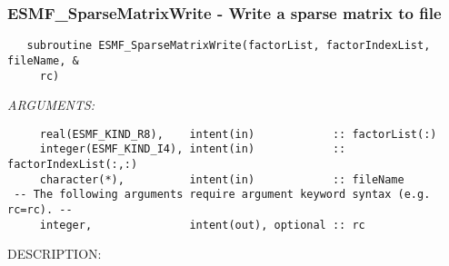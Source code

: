  
\setlength{\oldparskip}{\parskip}
\setlength{\parskip}{1.5ex}
\setlength{\oldparindent}{\parindent}
\setlength{\parindent}{0pt}
\setlength{\oldbaselineskip}{\baselineskip}
\setlength{\baselineskip}{11pt}
 
\def\bv{\begin{verbatim}}
\def\ev{\end{verbatim}}
\def\be{\begin{equation}}
\def\ee{\end{equation}}
\def\bea{\begin{eqnarray}}
\def\eea{\end{eqnarray}}
\def\bi{\begin{itemize}}
\def\ei{\end{itemize}}
\def\bn{\begin{enumerate}}
\def\en{\end{enumerate}}
\def\bd{\begin{description}}
\def\ed{\end{description}}
\def\({\left (}
\def\){\right )}
\def\[{\left [}
\def\]{\right ]}
\def\<{\left  \langle}
\def\>{\right \rangle}
\def\cI{{\cal I}}
\def\diag{\mathop{\rm diag}}
\def\tr{\mathop{\rm tr}}


 
\subsubsection [ESMF\_SparseMatrixWrite] {ESMF\_SparseMatrixWrite - Write a sparse matrix to file}


   \label{api:SparseMatrixWrite}
  
\begin{verbatim}   subroutine ESMF_SparseMatrixWrite(factorList, factorIndexList, fileName, &
     rc)\end{verbatim}{\em ARGUMENTS:}
\begin{verbatim}     real(ESMF_KIND_R8),    intent(in)            :: factorList(:)
     integer(ESMF_KIND_I4), intent(in)            :: factorIndexList(:,:)
     character(*),          intent(in)            :: fileName
 -- The following arguments require argument keyword syntax (e.g. rc=rc). --
     integer,               intent(out), optional :: rc\end{verbatim}
{\sf DESCRIPTION:\\ }


